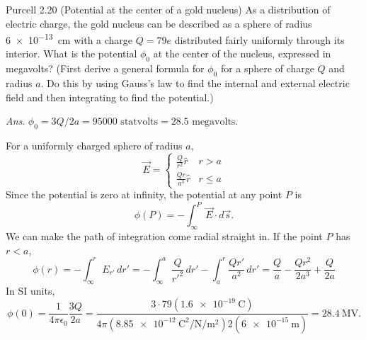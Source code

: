 \documentclass{esg8022pset}
\begin{document}
\begin{problem}{Purcell 2.20 (Potential at the center of a gold nucleus)}
  As a distribution of electric charge, the gold nucleus can be 
  described as a sphere of radius \SI{6e-13}{\centi\meter} with a charge $Q = 79e$ 
  distributed fairly uniformly through its interior. What is the potential 
  $\phi_0$ at the center of the nucleus, expressed in megavolts? (First derive 
  a general formula for $\phi_0$ for a sphere of charge $Q$ and radius $a$. Do 
  this by using Gauss's law to find the internal and external electric field 
  and then integrating to find the potential.) 
  \begin{flushright} \emph{Ans}. $\phi_0 = 3Q/2a = \num{95000}\text{ statvolts} = 28.5\text{ megavolts}$. \end{flushright}
\end{problem}
\begin{solution}
  For a uniformly charged sphere of radius $a$,
  \[ \vec{E} = \begin{cases} \frac{Q}{r^2}\hat{r} & r>a \\ \frac{Qr}{a^3}\hat r & r\le a \end{cases} \]
  Since the potential is zero at infinity, the potential at any point $P$ is
  \[ \phi(P) = -\int_\infty^P \vec{E}\cdot d\vec s. \]
  We can make the path of integration come radial straight in. If the point $P$ has $r<a$,
  \[ \phi(r) = -\int_\infty^r E_{r'}\,dr' = -\int_\infty^a \frac{Q}{r'^2}\,dr' - \int_a^r\frac{Qr'}{a^2}\,dr' = \frac{Q}{a} - \frac{Qr^2}{2a^3} + \frac{Q}{2a} \]
  In SI units, 
  \[ \phi(0) = \frac{1}{4\pi\epsilon_0}\frac{3Q}{2a} = \frac{3\cdot79(\SI{1.6e-19}{\coulomb})}{4\pi(\SI{8.85e-12}{\coulomb\squared\per\newton\per\meter\squared})2(\SI{6e-15}{\meter})} = \SI{28.4}{\mega\volt}. \]
\end{solution}
\end{document}
